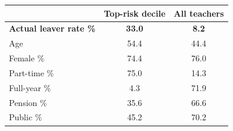\begin{tabular}{lcc}
\toprule
 & Top-risk decile & All teachers \\
\midrule
\textbf{Actual leaver rate \%} & \textbf{33.0} & \textbf{8.2} \\
\midrule
Age & 54.4 & 44.4 \\
Female \% & 74.4 & 76.0 \\
Part-time \% & 75.0 & 14.3 \\
Full-year \% & 4.3 & 71.9 \\
Pension \% & 35.6 & 66.6 \\
Public \% & 45.2 & 70.2 \\
\bottomrule
\end{tabular}
